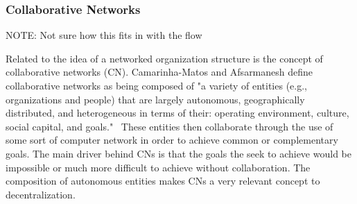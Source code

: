 %
%
%
 


\subsubsection{Collaborative Networks}

NOTE: Not sure how this fits in with the flow

Related to the idea of a networked organization structure is the concept of collaborative networks (CN). Camarinha-Matos and Afsarmanesh define collaborative networks as being composed of "a variety of entities (e.g., organizations and people) that are largely autonomous, geographically distributed, and heterogeneous in terms of their: operating environment, culture, social capital, and goals."~\cite{Camarinha-Matos2005} These entities then collaborate through the use of some sort of computer network in order to achieve common or complementary goals. The main driver behind CNs is that the goals the seek to achieve would be impossible or much more difficult to achieve without collaboration. The composition of autonomous entities makes CNs a very relevant concept to decentralization. 

